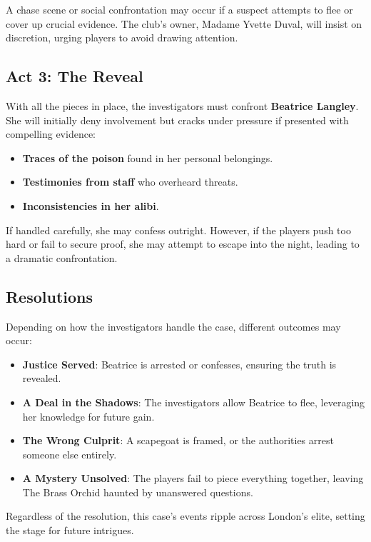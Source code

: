 
\noindent
A chase scene or social confrontation may occur if a suspect attempts to flee or cover up crucial evidence. The club’s owner, Madame Yvette Duval, will insist on discretion, urging players to avoid drawing attention.

\subsection{Act 3: The Reveal} 
With all the pieces in place, the investigators must confront \textbf{Beatrice Langley}. She will initially deny involvement but cracks under pressure if presented with compelling evidence:
\begin{DndReadAloud}{}
	\begin{itemize}
		\item \textbf{Traces of the poison} found in her personal belongings.
		\item \textbf{Testimonies from staff} who overheard threats.
		\item \textbf{Inconsistencies in her alibi}.
	\end{itemize}
\end{DndReadAloud}

\noindent
If handled carefully, she may confess outright. However, if the players push too hard or fail to secure proof, she may attempt to escape into the night, leading to a dramatic confrontation.

\subsection{Resolutions} 
Depending on how the investigators handle the case, different outcomes may occur:
\begin{itemize}
	\item \textbf{Justice Served}: Beatrice is arrested or confesses, ensuring the truth is revealed.
	\item \textbf{A Deal in the Shadows}: The investigators allow Beatrice to flee, leveraging her knowledge for future gain.
	\item \textbf{The Wrong Culprit}: A scapegoat is framed, or the authorities arrest someone else entirely.
	\item \textbf{A Mystery Unsolved}: The players fail to piece everything together, leaving The Brass Orchid haunted by unanswered questions.
\end{itemize}

Regardless of the resolution, this case's events ripple across London’s elite, setting the stage for future intrigues.
